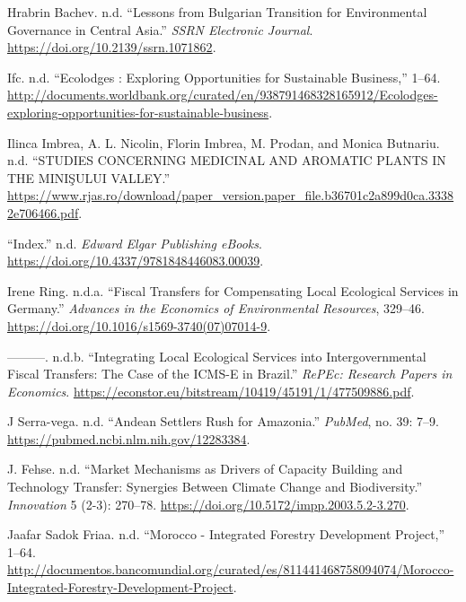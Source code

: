 \begin{CSLReferences}{1}{0}
Hrabrin Bachev. n.d. {``Lessons from Bulgarian Transition for
Environmental Governance in Central Asia.''} \emph{SSRN Electronic
Journal}. \url{https://doi.org/10.2139/ssrn.1071862}.

Ifc. n.d. {``Ecolodges : Exploring Opportunities for Sustainable
Business,''} 1--64.
\url{http://documents.worldbank.org/curated/en/938791468328165912/Ecolodges-exploring-opportunities-for-sustainable-business}.

Ilinca Imbrea, A. L. Nicolin, Florin Imbrea, M. Prodan, and Monica
Butnariu. n.d. {``STUDIES CONCERNING MEDICINAL AND AROMATIC PLANTS IN
THE MINIŞULUI VALLEY.''}
\url{https://www.rjas.ro/download/paper_version.paper_file.b36701c2a899d0ca.33382e706466.pdf}.

{``Index.''} n.d. \emph{Edward Elgar Publishing eBooks}.
\url{https://doi.org/10.4337/9781848446083.00039}.

Irene Ring. n.d.a. {``Fiscal Transfers for Compensating Local Ecological
Services in Germany.''} \emph{Advances in the Economics of Environmental
Resources}, 329--46.
\url{https://doi.org/10.1016/s1569-3740(07)07014-9}.

---------. n.d.b. {``Integrating Local Ecological Services into
Intergovernmental Fiscal Transfers: The Case of the ICMS-E in Brazil.''}
\emph{RePEc: Research Papers in Economics}.
\url{https://econstor.eu/bitstream/10419/45191/1/477509886.pdf}.

J Serra-vega. n.d. {``Andean Settlers Rush for Amazonia.''}
\emph{PubMed}, no. 39: 7--9.
\url{https://pubmed.ncbi.nlm.nih.gov/12283384}.

J. Fehse. n.d. {``Market Mechanisms as Drivers of Capacity Building and
Technology Transfer: Synergies Between Climate Change and
Biodiversity.''} \emph{Innovation} 5 (2-3): 270--78.
\url{https://doi.org/10.5172/impp.2003.5.2-3.270}.

Jaafar Sadok Friaa. n.d. {``Morocco - Integrated Forestry Development
Project,''} 1--64.
\url{http://documentos.bancomundial.org/curated/es/811441468758094074/Morocco-Integrated-Forestry-Development-Project}.


\end{CSLReferences}
